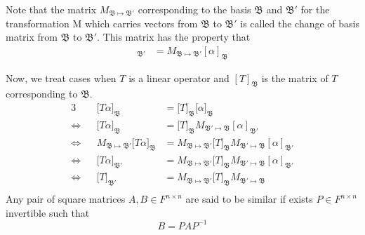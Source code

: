 \documentclass[../../../main.tex]{subfiles}
\begin{document}
Note that the matrix $M_{\mathfrak{B}\mapsto\mathfrak{B'}}$ corresponding to the basis $\mathfrak{B}$ and $\mathfrak{B'}$ for the transformation M which carries vectors from $\mathfrak{B}$ to $\mathfrak{B'}$ is called the change of basis matrix from $\mathfrak{B}$ to $\mathfrak{B'}$. This matrix has the property that 
\begin{align*}
    [\alpha]_{\mathfrak{B'}}&=
    M_{\mathfrak{B}\mapsto\mathfrak{B'}}[\alpha]_{\mathfrak{B}}
\end{align*}

Now, we treat cases when $T$ is a linear operator and $[T]_{\mathfrak{B}}$ is the matrix of $T$ corresponding to $\mathfrak{B}$.
\begin{alignat*}{3}
    &
    &\big[T\alpha\big]_{\mathfrak{B}} 
    &=\big[T\big]_{\mathfrak{B}}\big[\alpha\big]_{\mathfrak{B}}
    \\
    \Longleftrightarrow&
    &\big[T\alpha\big]_{\mathfrak{B}} 
    &=\big[T\big]_{\mathfrak{B}}M_{\mathfrak{B'}\mapsto\mathfrak{B}}[\alpha]_{\mathfrak{B'}}
    \\
    \Longleftrightarrow&
    &M_{\mathfrak{B}\mapsto\mathfrak{B'}}\big[T\alpha\big]_{\mathfrak{B}} 
    &=M_{\mathfrak{B}\mapsto\mathfrak{B'}}\big[T\big]_{\mathfrak{B}}M_{\mathfrak{B'}\mapsto\mathfrak{B}}[\alpha]_{\mathfrak{B'}}
    \\
    \Longleftrightarrow&
    &\big[T\alpha\big]_{\mathfrak{B'}} 
    &=M_{\mathfrak{B}\mapsto\mathfrak{B'}}\big[T\big]_{\mathfrak{B}}M_{\mathfrak{B'}\mapsto\mathfrak{B}}[\alpha]_{\mathfrak{B'}}
    \\
    \Longleftrightarrow&
    &\big[T\big]_{\mathfrak{B'}} 
    &=M_{\mathfrak{B}\mapsto\mathfrak{B'}}\big[T\big]_{\mathfrak{B}}M_{\mathfrak{B'}\mapsto\mathfrak{B}}
    \\
\end{alignat*}
Any pair of square matrices $A,B\in F^{n\times n}$ are said to be similar if exists $P\in F^{n\times n}$ invertible such that
\begin{equation*}
    B = PAP^{-1}
\end{equation*}
\end{document}
